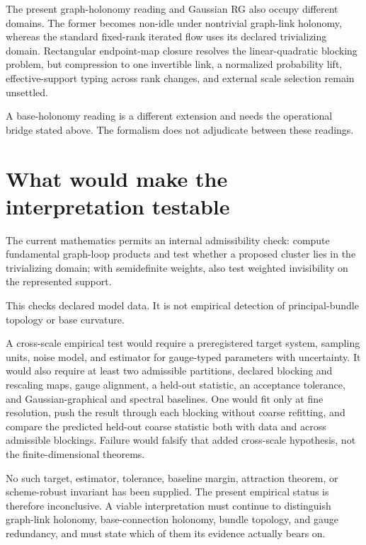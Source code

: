 The present graph-holonomy reading and Gaussian RG also occupy different
domains.  The former becomes non-idle under nontrivial graph-link holonomy,
whereas the standard fixed-rank iterated flow uses its declared trivializing
domain.  Rectangular endpoint-map closure resolves the linear-quadratic
blocking problem, but compression to one invertible link, a normalized
probability lift, effective-support typing across rank changes, and external
scale selection remain unsettled. 

A base-holonomy reading is a different extension and needs the operational
bridge stated above. The formalism does not adjudicate between these readings.

\section{What would make the interpretation testable}
\label{sec:phil-testable}

The current mathematics permits an internal admissibility check: compute
fundamental graph-loop products and test whether a proposed cluster lies in
the trivializing domain; with semidefinite weights, also test weighted
invisibility on the represented support. 

This checks declared model data. It is not empirical detection of
principal-bundle topology or base curvature. 

A cross-scale empirical test would require a preregistered target system,
sampling units, noise model, and estimator for gauge-typed parameters with
uncertainty.  It would also require at least two admissible partitions,
declared blocking and rescaling maps, gauge alignment, a held-out statistic,
an acceptance tolerance, and Gaussian-graphical and spectral baselines.  One
would fit only at fine resolution, push the result through each blocking
without coarse refitting, and compare the predicted held-out coarse statistic
both with data and across admissible blockings.  Failure would falsify that
added cross-scale hypothesis, not the finite-dimensional theorems.

No such target, estimator, tolerance, baseline margin, attraction theorem, or
scheme-robust invariant has been supplied.  The present empirical status is
therefore inconclusive.  A viable interpretation must continue to distinguish
graph-link holonomy, base-connection holonomy, bundle topology, and gauge
redundancy, and must state which of them its evidence actually bears on.
